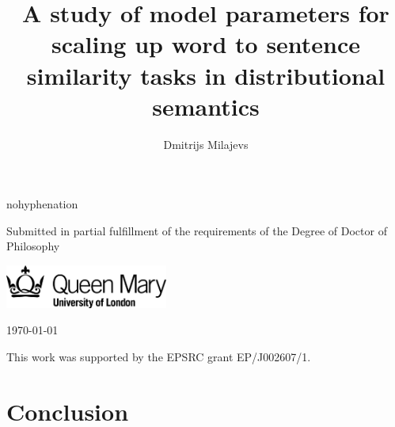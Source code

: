 \documentclass[11pt,a4paper,english,oneside]{book}
\title{A study of model parameters for scaling up word to sentence similarity tasks in distributional semantics}
\author{Dmitrijs Milajevs}
\begin{document}
\begin{titlepage}
  \headingfont
    \vspace*{1cm}

    \begin{hyphenrules}{nohyphenation}
      {\Large \thetitle}
    \end{hyphenrules}

    \vspace{1.5cm}

    {\large \theauthor}

    \vfill


    \vspace{0.8cm}

    \begin{center}
     Submitted in partial fulfillment of the requirements of the Degree of Doctor of Philosophy

     \vspace{0.8cm}

     \includegraphics[width=0.4\textwidth]{qmlogo}

      \vspace{0.8cm}
      \today
    \end{center}
\end{titlepage}
\addtocounter{page}{1}


\cleardoublepage

\vspace*{\fill}
\begin{center}
  This work was supported by the EPSRC grant EP/J002607/1.
\end{center}
\vfill
\thispagestyle{plain}
\cleardoublepage


\thispagestyle{plain}
\cleardoublepage

{
  \pagestyle{plain}
  \tableofcontents
  \cleardoublepage
  \listoffigures
  \cleardoublepage
  \listoftables
  \thispagestyle{plain}
}








\chapter{Conclusion}
\label{cha:conclusion}
\end{document}
